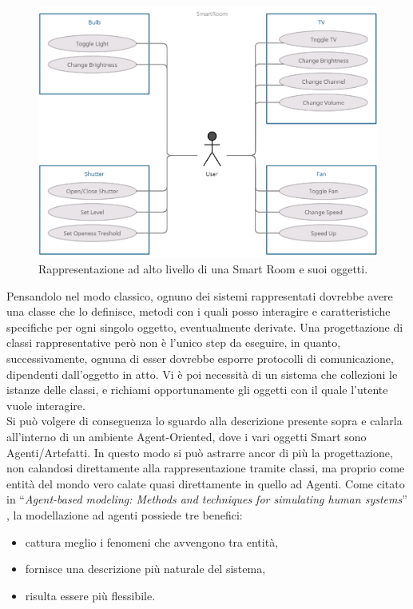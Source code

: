 \documentclass[12pt,a4paper,openright,oneside]{report}
\newcommand{\quotes}[1]{``#1''}
\begin{document}
\begin{figure}[h]
	\centering
	\includegraphics[scale=0.5]{eps/use-case-high-agent-simple.png}
	\caption{Rappresentazione ad alto livello di una Smart Room e suoi oggetti.}
	\label{fig:use-case-diagram-high}
\end{figure}

Pensandolo nel modo classico, ognuno dei sistemi rappresentati dovrebbe avere una classe che lo definisce, metodi con i quali posso interagire e caratteristiche specifiche per ogni singolo oggetto, eventualmente derivate. Una progettazione di classi rappresentative però non è l'unico step da eseguire, in quanto, successivamente, ognuna di esser dovrebbe esporre protocolli di comunicazione, dipendenti dall'oggetto in atto. Vi è poi necessità di un sistema che collezioni le istanze delle classi, e richiami opportunamente gli oggetti con il quale l'utente vuole interagire.\\

Si può volgere di conseguenza lo sguardo alla descrizione presente sopra e calarla all'interno di un ambiente Agent-Oriented, dove i vari oggetti Smart sono Agenti/Artefatti. In questo modo si può astrarre ancor di più la progettazione, non calandosi direttamente alla rappresentazione tramite classi, ma proprio come entità del mondo vero calate quasi direttamente in quello ad Agenti. Come citato in \quotes{\textit{Agent-based modeling: Methods and techniques for simulating human systems}} \cite{abm}, la modellazione ad agenti possiede tre benefici:

\begin{itemize}
	\itemsep0em 
	\item cattura meglio i fenomeni che avvengono tra entità,
	\item fornisce una descrizione più naturale del sistema,
	\item risulta essere più flessibile.
\end{itemize}
\end{document}
